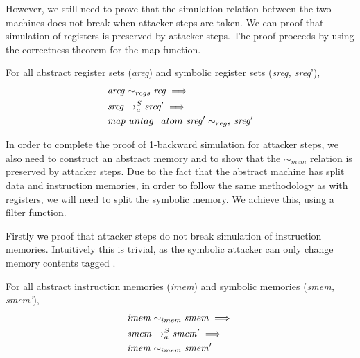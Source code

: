 However, we still need to prove that the simulation relation between
the two machines does not break when attacker steps are taken.
We can proof that simulation of registers is preserved by attacker
steps. The proof proceeds by using the correctness theorem for the map function.

\begin{lemma}
\label{areg_map_preserves_ref}
  For all abstract register sets (\textit{areg})
  and symbolic register sets (\textit{sreg, sreg}'),
  \begin{align*}
    & \mathit{areg} \sim_{regs} \mathit{reg} \implies \\
    & \stepa{\mathit{sreg}}{\mathit{sreg}'}{S} \implies \\
    & \mathit{map}~untag\_atom~\mathit{sreg}' \sim_{regs} \mathit{sreg}'
  \end{align*}
\end{lemma}

In order to complete the proof of 1-backward simulation for attacker
steps, we also need to construct an abstract memory and to show
that the $\sim_{mem}$ relation is preserved by attacker steps.
Due to the fact that the abstract machine has split data and instruction
memories, in order to follow the same methodology as with registers,
we will need to split the symbolic memory. We achieve this, using a
filter function.

Firstly we proof that attacker steps do not break simulation of
instruction memories. Intuitively this is trivial, as the symbolic
attacker can only change memory contents tagged \DATAname.

\begin{lemma}
\label{imem_attacker_ref}
  For all abstract instruction memories (\textit{imem})
  and symbolic memories (\textit{smem, smem'}),
  \begin{align*}
    & \mathit{imem} \sim_{imem} \mathit{smem} \implies \\
    & \stepa{\mathit{smem}}{\mathit{smem}'}{S} \implies \\
    & \mathit{imem} \sim_{imem} \mathit{smem}'
  \end{align*}
\end{lemma}

